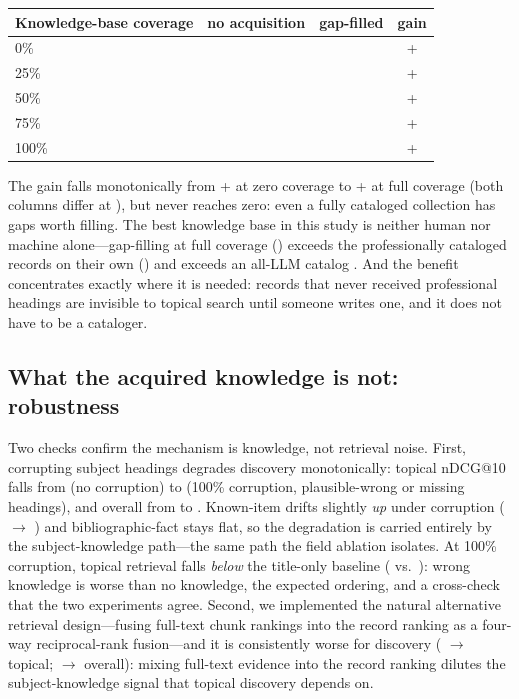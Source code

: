 \begin{center}
\begin{tabular}{lccc}
\toprule
Knowledge-base coverage & no acquisition & gap-filled & gain \\
\midrule
0\% & \SpBaseZero{} & \SpEnrZero{} & +\SpGainZero{} \\
25\% & \SpBaseTwentyFive{} & \SpEnrTwentyFive{} & +\SpGainTwentyFive{} \\
50\% & \SpBaseFifty{} & \SpEnrFifty{} & +\SpGainFifty{} \\
75\% & \SpBaseSeventyFive{} & \SpEnrSeventyFive{} & +\SpGainSeventyFive{} \\
100\% & \SpBaseHundred{} & \SpEnrHundred{} & +\SpGainHundred{} \\
\bottomrule
\end{tabular}
\end{center}

The gain falls monotonically from +\SpGainZero{} at zero coverage to
+\SpGainHundred{} at full coverage (both columns differ at
\SpP{}), but never reaches zero: even a fully cataloged collection has
gaps worth filling. The best knowledge base in this study is neither human
nor machine alone---gap-filling at full coverage
(\SpEnrHundred{}) exceeds the professionally cataloged records on their
own (\SpBaseHundred{}) and exceeds an all-LLM catalog
. And the benefit concentrates
exactly where it is needed: records that never received professional
headings are invisible to topical search until someone writes one, and it
does not have to be a cataloger.

\subsection{What the acquired knowledge is not: robustness}

Two checks confirm the mechanism is knowledge, not retrieval noise. First,
corrupting subject headings degrades discovery monotonically: topical
nDCG@10 falls from \NoiseZeroTopical{} (no corruption) to
\NoiseHundredTopical{} (100\% corruption, plausible-wrong or missing
headings), and overall from \NoiseZeroOverall{} to \NoiseHundredOverall{}.
Known-item drifts slightly \emph{up} under corruption (\NoiseZeroKnown{}
$\rightarrow$ \NoiseHundredKnown{}) and bibliographic-fact stays flat,
so the degradation is carried entirely by the subject-knowledge path---the
same path the field ablation isolates. At 100\% corruption, topical
retrieval falls \emph{below} the title-only baseline
(\NoiseHundredTopical{} vs.\ \AblTitleOnlyTopical{}): wrong knowledge is
worse than no knowledge, the expected ordering, and a cross-check that the
two experiments agree. Second, we implemented the natural alternative
retrieval design---fusing full-text chunk rankings into the record ranking
as a four-way reciprocal-rank fusion---and it is consistently worse for
discovery (\TopicalMeta{} $\rightarrow$ \FourTopical{} topical;
\OverallMeta{} $\rightarrow$ \FourOverall{} overall): mixing full-text
evidence into the record ranking dilutes the subject-knowledge signal that
topical discovery depends on.

